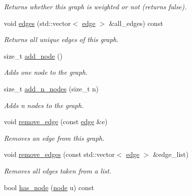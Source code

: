 \begin{DoxyCompactItemize}
\begin{DoxyCompactList}\small\item\em Returns whether this graph is weighted or not (returns false). \end{DoxyCompactList}\item 
void \hyperlink{classlgraph_1_1uxgraph_af6a643eaca31fa945b428567ab0fa66d}{edges} (std\-::vector$<$ \hyperlink{namespacelgraph_a76bd7d50719f03de7a85db259d80d572}{edge} $>$ \&all\-\_\-edges) const 
\begin{DoxyCompactList}\small\item\em Returns all unique edges of this graph. \end{DoxyCompactList}\item 
size\-\_\-t \hyperlink{classlgraph_1_1xxgraph_a6cb21d5e52afbb438a3e6643998c40cf}{add\-\_\-node} ()
\begin{DoxyCompactList}\small\item\em Adds one node to the graph. \end{DoxyCompactList}\item 
size\-\_\-t \hyperlink{classlgraph_1_1xxgraph_a8dd24aa48d55dfceaa87e47c32ae914a}{add\-\_\-n\-\_\-nodes} (size\-\_\-t n)
\begin{DoxyCompactList}\small\item\em Adds {\itshape n} nodes to the graph. \end{DoxyCompactList}\item 
void \hyperlink{classlgraph_1_1xxgraph_a46a75fa2a10a8674ab930e9dc766e2f9}{remove\-\_\-edge} (const \hyperlink{namespacelgraph_a76bd7d50719f03de7a85db259d80d572}{edge} \&e)
\begin{DoxyCompactList}\small\item\em Removes an edge from this graph. \end{DoxyCompactList}\item 
void \hyperlink{classlgraph_1_1xxgraph_aef7c4bf62f3f4db362b2d3accb3b6d3d}{remove\-\_\-edges} (const std\-::vector$<$ \hyperlink{namespacelgraph_a76bd7d50719f03de7a85db259d80d572}{edge} $>$ \&edge\-\_\-list)
\begin{DoxyCompactList}\small\item\em Removes all edges taken from a list. \end{DoxyCompactList}\item 
\hypertarget{classlgraph_1_1xxgraph_ac2ff3b6ec8da7c5b61d1c84215eed680}{bool \hyperlink{classlgraph_1_1xxgraph_ac2ff3b6ec8da7c5b61d1c84215eed680}{has\-\_\-node} (\hyperlink{namespacelgraph_a397169dd66adf725210a30fb7251773e}{node} u) const }\label{classlgraph_1_1xxgraph_ac2ff3b6ec8da7c5b61d1c84215eed680}


\end{DoxyCompactItemize}
